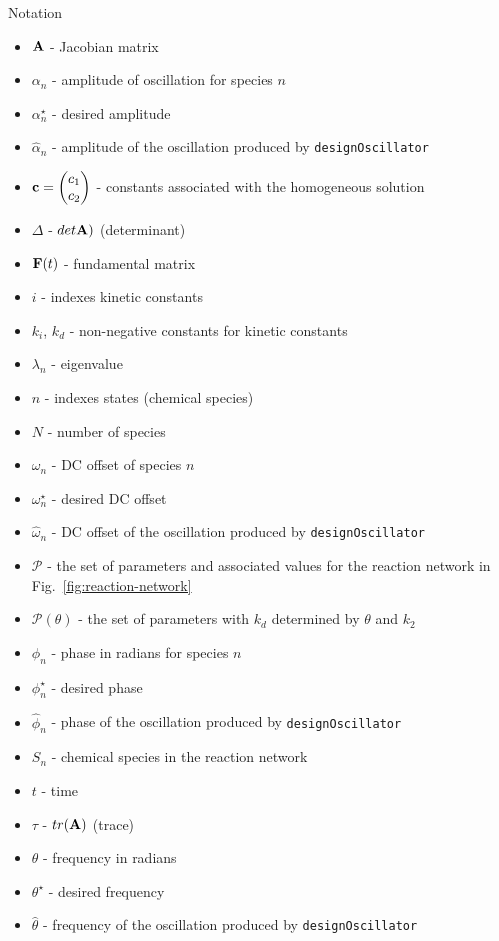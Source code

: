 \documentclass{bmcart}
\newcommand{\fig}[1]{Fig.~\ref{#1}}
\begin{document}
\begin{backmatter}
Notation
\begin{itemize}
\item ${\bf A}$ - Jacobian matrix
\item $\alpha_n$ - amplitude of oscillation for species $n$
\item $\alpha_n^{\star}$ - desired amplitude
\item $\hat{\alpha}_n$ - amplitude of the oscillation produced by {\tt designOscillator}
\item ${\bf c} = \begin{pmatrix} c_1 \\ c_2 \end{pmatrix}$ - constants associated with the homogeneous solution
\item $\Delta$ -
$det {\bf A})$ (determinant)
\item  ${\bf F} (t)$ - fundamental matrix
\item $i$ - indexes kinetic constants
\item $k_i$, $k_d$ -
non-negative constants for kinetic constants
\item $\lambda_n$ -
eigenvalue
\item $n$ - indexes states (chemical species)
\item $N$ - number of species
\item $\omega_n$ - DC offset of species $n$
\item $\omega_n^{\star}$ - desired DC offset
\item $\hat{\omega}_n$ - DC offset of the oscillation produced by {\tt designOscillator}
\item $\mathcal{P}$ - the set of parameters and associated values for the reaction network in \fig{fig:reaction-network}
\item $\mathcal{P} (\theta)$ - the set of parameters with $k_d$ determined by $\theta$ and $k_2$
\item $\phi_n$ - phase in radians for species $n$
\item $\phi_n^{\star}$ - desired phase
\item $\hat{\phi}_n$ - phase of the oscillation produced by {\tt designOscillator}
\item $S_n$ - chemical species in the reaction network
\item $t$ - time 
\item $\tau$ - $tr({\bf A})$ (trace)
\item $\theta$ - frequency in
radians
\item $\theta^{\star}$ - desired frequency
\item $\hat{\theta}$ - frequency of the oscillation produced by {\tt designOscillator}

\end{itemize}
\end{backmatter}
\end{document}
